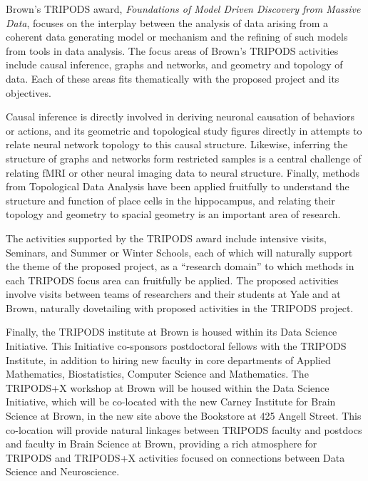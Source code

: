 
Brown's TRIPODS award, \emph{Foundations of Model Driven Discovery from Massive Data}, focuses on the interplay between the analysis of data arising from a coherent data generating model or mechanism and the refining of such models from tools in data analysis. The focus areas of Brown's TRIPODS activities include causal inference, graphs and networks, and geometry and topology of data. Each of these areas fits thematically with the proposed project and its objectives.

Causal inference is directly involved in deriving neuronal causation of behaviors or actions, and its geometric and topological study figures directly in attempts to relate neural network topology to this causal structure.
Likewise, inferring the structure of graphs and networks form restricted samples is a central challenge of relating fMRI or other neural imaging data to neural structure. 
Finally, methods from Topological Data Analysis have been applied fruitfully to understand the structure and function of place cells in the hippocampus, and relating their topology and geometry to spacial geometry is an important area of research.

The activities supported by the TRIPODS award include intensive visits, Seminars, and Summer or Winter Schools, each of which will naturally support the theme of the proposed project, as a ``research domain'' to which methods in each TRIPODS focus area can fruitfully be applied. The proposed activities involve visits between teams of researchers and their students at Yale and at Brown, naturally dovetailing with proposed activities in the TRIPODS project. 

Finally, the TRIPODS institute at Brown is housed within its Data Science Initiative. This Initiative co-sponsors postdoctoral fellows with the TRIPODS Institute, in addition to hiring new faculty in core departments of Applied Mathematics, Biostatistics, Computer Science and Mathematics. The TRIPODS+X workshop at Brown will be housed within the Data Science Initiative, which will be co-located with the new Carney Institute for Brain Science at Brown, in the new site above the Bookstore at 425 Angell Street. This co-location will provide natural linkages between TRIPODS faculty and postdocs and faculty in Brain Science at Brown, providing a rich atmosphere for TRIPODS and TRIPODS+X activities focused on connections between Data Science and Neuroscience.
